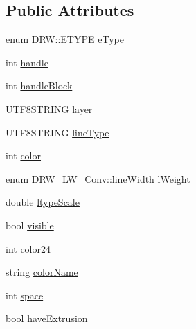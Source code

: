 \subsection*{Public Attributes}
\begin{DoxyCompactItemize}
\item 
enum D\-R\-W\-::\-E\-T\-Y\-P\-E \hyperlink{classDRW__Entity_a36dff42707384984a085dbea602d0217}{e\-Type}
\item 
int \hyperlink{classDRW__Entity_a32f66a2b4da26f1f9a42ffa8539c916c}{handle}
\item 
int \hyperlink{classDRW__Entity_a8be4a86f2b846ecc0723e2b9b5b33f0f}{handle\-Block}
\item 
U\-T\-F8\-S\-T\-R\-I\-N\-G \hyperlink{classDRW__Entity_a65b68c6c8712de3e2fada1d263b96042}{layer}
\item 
U\-T\-F8\-S\-T\-R\-I\-N\-G \hyperlink{classDRW__Entity_a1180883df434a22fdafbc8ac1273e46e}{line\-Type}
\item 
int \hyperlink{classDRW__Entity_a199afc08d2cc4c44ea58d49780582526}{color}
\item 
enum \hyperlink{classDRW__LW__Conv_aed68cbc3d8bdf7e20003dd2d970279b3}{D\-R\-W\-\_\-\-L\-W\-\_\-\-Conv\-::line\-Width} \hyperlink{classDRW__Entity_a5e01429ed3b7199b17367a5c85970a0d}{l\-Weight}
\item 
double \hyperlink{classDRW__Entity_a167d107e81c5b2bb4ee015fa62e2fde2}{ltype\-Scale}
\item 
bool \hyperlink{classDRW__Entity_a410a134f3127298598a0075e60f3616d}{visible}
\item 
int \hyperlink{classDRW__Entity_a4448fbdbe618f83ed71a7c1ed98caeae}{color24}
\item 
string \hyperlink{classDRW__Entity_a67795f82419627d5d6b56b874dc29f59}{color\-Name}
\item 
int \hyperlink{classDRW__Entity_aea0364c7833d7c0811b257292278fa7c}{space}
\item 
bool \hyperlink{classDRW__Entity_a62545716d4aec61cabb85576afc78dee}{have\-Extrusion}
\end{DoxyCompactItemize}
